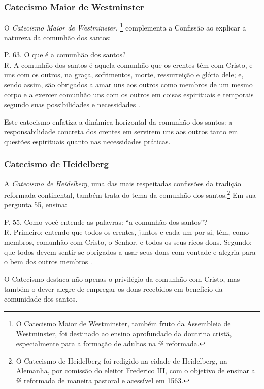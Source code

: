 \subsubsection{Catecismo Maior de Westminster}
O \textit{Catecismo Maior de Westminster}, \footnote{O Catecismo Maior de Westminster, também fruto da Assembleia de Westminster, foi destinado ao ensino aprofundado da doutrina cristã, especialmente para a formação de adultos na fé reformada.} complementa a Confissão ao explicar a natureza da comunhão dos santos:
\begin{citacao}
P. 63. O que é a comunhão dos santos?\\
R. A comunhão dos santos é aquela comunhão que os crentes têm com Cristo, e uns com os outros, na graça, sofrimentos, morte, ressurreição e glória dele; e, sendo assim, são obrigados a amar uns aos outros como membros de um mesmo corpo e a exercer comunhão uns com os outros em coisas espirituais e temporais segundo suas possibilidades e necessidades \cite{catecismoMaior}.
\end{citacao}

Este catecismo enfatiza a dinâmica horizontal da comunhão dos santos: a responsabilidade concreta dos crentes em servirem uns aos outros tanto em questões espirituais quanto nas necessidades práticas.

\subsubsection{Catecismo de Heidelberg}
A \textit{Catecismo de Heidelberg}, uma das mais respeitadas confissões da tradição reformada continental, também trata do tema da comunhão dos santos.\footnote{O Catecismo de Heidelberg foi redigido na cidade de Heidelberg, na Alemanha, por comissão do eleitor Frederico III, com o objetivo de ensinar a fé reformada de maneira pastoral e acessível em 1563.} Em sua pergunta 55, ensina:
\begin{citacao}
P. 55. Como você entende as palavras: ``a comunhão dos santos''?\\
R. Primeiro: entendo que todos os crentes, juntos e cada um por si, têm, como membros, comunhão com Cristo, o Senhor, e todos os seus ricos dons. Segundo: que todos devem sentir-se obrigados a usar seus dons com vontade e alegria para o bem dos outros membros \cite{heidelberg}.
\end{citacao}

O Catecismo destaca não apenas o privilégio da comunhão com Cristo, mas também o dever alegre de empregar os dons recebidos em benefício da comunidade dos santos.

